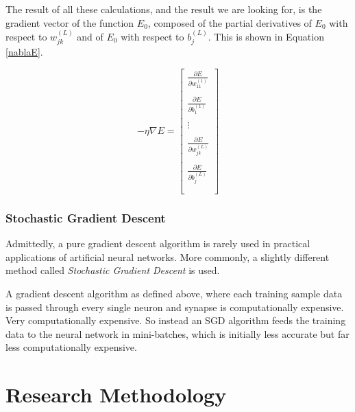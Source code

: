 \documentclass[12pt]{article}
\begin{document}
        The result of all these calculations, and the result we are looking for, is the gradient vector of the function $E_0$, composed of the partial derivatives of $E_0$ with respect to $w_{jk}^{(L)}$ and of $E_0$ with respect to $b_j^{(L)}$. This is shown in Equation \ref{nablaE}.

        \begin{equation} \label{nablaE}
            -\eta \nabla E = \begin{bmatrix}
                \frac{\partial E}{\partial w_{11}^{(1)}} \\\\
                \frac{\partial E}{\partial b_1^{(1)}} \\\\
                \vdots \\\\
                \frac{\partial E}{\partial w_{jk}^{(L)}} \\\\
                \frac{\partial E}{\partial b_j^{(L)}} \\\\
            \end{bmatrix}
        \end{equation}

        \subsubsection{Stochastic Gradient Descent}

            Admittedly, a pure gradient descent algorithm is rarely used in practical applications of artificial neural networks. More commonly, a slightly different method called \textit{Stochastic Gradient Descent} is used. 

            A gradient descent algorithm as defined above, where each training sample data is passed through every single neuron and synapse is computationally expensive. Very computationally expensive. So instead an SGD algorithm feeds the training data to the neural network in mini-batches, which is initially less accurate but far less computationally expensive.

\section{Research Methodology \label{methodology}}

\end{document}
